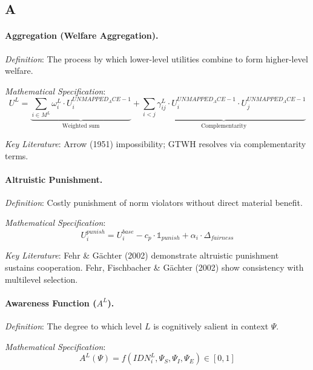 \subsection*{A}

\paragraph{Aggregation (Welfare Aggregation).}
\textit{Definition}: The process by which lower-level utilities combine to form 
higher-level welfare.

\textit{Mathematical Specification}:
\begin{equation}
U^L = \underbrace{\sum_{i \in M^L} \omega^L_i \cdot U^{UNMAPPED_ACE-1}_i}_{\text{Weighted sum}} + 
\underbrace{\sum_{i < j} \gamma^L_{ij} \cdot U^{UNMAPPED_ACE-1}_i \cdot U^{UNMAPPED_ACE-1}_j}_{\text{Complementarity}}
\end{equation}

\textit{Key Literature}: Arrow (1951) impossibility; GTWH resolves via 
complementarity terms.

\medskip

\paragraph{Altruistic Punishment.}
\textit{Definition}: Costly punishment of norm violators without direct material benefit.

\textit{Mathematical Specification}:
\begin{equation}
U_i^{punish} = U_i^{base} - c_p \cdot \mathbb{1}_{punish} + \alpha_i \cdot \Delta_{fairness}
\end{equation}

\textit{Key Literature}: Fehr \& Gächter (2002) demonstrate altruistic punishment 
sustains cooperation. Fehr, Fischbacher \& Gächter (2002) show consistency with 
multilevel selection.

\medskip

\paragraph{Awareness Function ($A^L$).}
\textit{Definition}: The degree to which level $L$ is cognitively salient in context $\Psi$.

\textit{Mathematical Specification}:
\begin{equation}
A^L(\Psi) = f\left( IDN^L_i, \Psi_S, \Psi_I, \Psi_E \right) \in [0, 1]
\end{equation}

